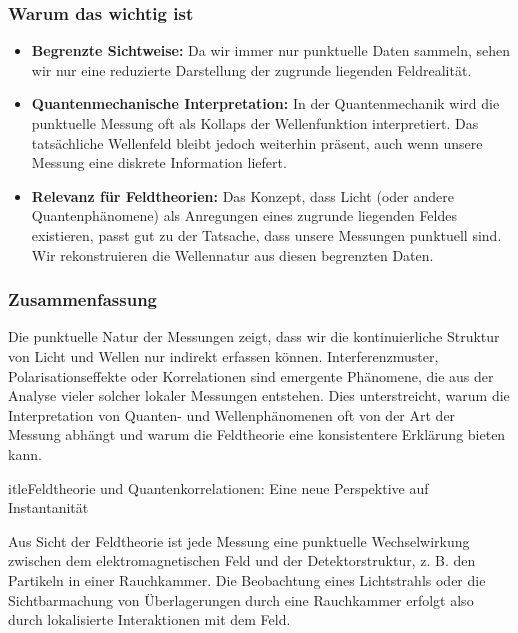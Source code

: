 \documentclass[12pt,a4paper]{article}
\begin{document}
	\subsubsection{Warum das wichtig ist}
	\begin{itemize}
		\item \textbf{Begrenzte Sichtweise:} Da wir immer nur punktuelle Daten sammeln, sehen wir nur eine reduzierte Darstellung der zugrunde liegenden Feldrealität.
		\item \textbf{Quantenmechanische Interpretation:} In der Quantenmechanik wird die punktuelle Messung oft als Kollaps der Wellenfunktion interpretiert. Das tatsächliche Wellenfeld bleibt jedoch weiterhin präsent, auch wenn unsere Messung eine diskrete Information liefert.
		\item \textbf{Relevanz für Feldtheorien:} Das Konzept, dass Licht (oder andere Quantenphänomene) als Anregungen eines zugrunde liegenden Feldes existieren, passt gut zu der Tatsache, dass unsere Messungen punktuell sind. Wir rekonstruieren die Wellennatur aus diesen begrenzten Daten.
	\end{itemize}
	
	\subsubsection{Zusammenfassung}
	Die punktuelle Natur der Messungen zeigt, dass wir die kontinuierliche Struktur von Licht und Wellen nur indirekt erfassen können. Interferenzmuster, Polarisationseffekte oder Korrelationen sind emergente Phänomene, die aus der Analyse vieler solcher lokaler Messungen entstehen. Dies unterstreicht, warum die Interpretation von Quanten- und Wellenphänomenen oft von der Art der Messung abhängt und warum die Feldtheorie eine konsistentere Erklärung bieten kann.
	
	
	
		itle{Feldtheorie und Quantenkorrelationen: Eine neue Perspektive auf Instantanität}
	
	
	
	
	\maketitle
	
	Aus Sicht der Feldtheorie ist jede Messung eine punktuelle Wechselwirkung zwischen dem elektromagnetischen Feld und der Detektorstruktur, z. B. den Partikeln in einer Rauchkammer. Die Beobachtung eines Lichtstrahls oder die Sichtbarmachung von Überlagerungen durch eine Rauchkammer erfolgt also durch lokalisierte Interaktionen mit dem Feld.
	
\end{document}
